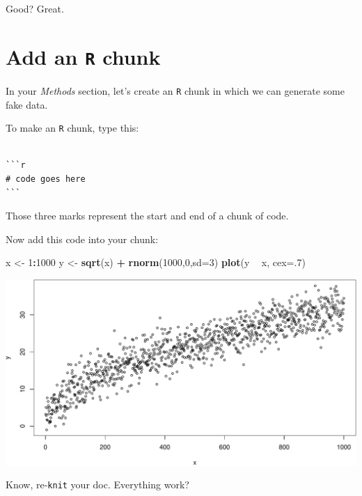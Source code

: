 \documentclass[]{book}
\newenvironment{Shaded}{\begin{snugshade}}{\end{snugshade}}
\newcommand{\DataTypeTok}[1]{\textcolor[rgb]{0.13,0.29,0.53}{#1}}
\newcommand{\DecValTok}[1]{\textcolor[rgb]{0.00,0.00,0.81}{#1}}
\newcommand{\KeywordTok}[1]{\textcolor[rgb]{0.13,0.29,0.53}{\textbf{#1}}}
\newcommand{\NormalTok}[1]{#1}
\newcommand{\OperatorTok}[1]{\textcolor[rgb]{0.81,0.36,0.00}{\textbf{#1}}}
\newcommand{\StringTok}[1]{\textcolor[rgb]{0.31,0.60,0.02}{#1}}
\begin{document}
Good? Great.

\hypertarget{add-an-r-chunk}{%
\section*{\texorpdfstring{Add an \texttt{R} chunk}{Add an R chunk}}\label{add-an-r-chunk}}

In your \emph{Methods} section, let's create an \texttt{R} chunk in which we can generate some fake data.

To make an \texttt{R} chunk, type this:

\begin{verbatim}

```r
# code goes here
```
\end{verbatim}

Those three marks represent the start and end of a chunk of code.

Now add this code into your chunk:

\begin{Shaded}
\begin{Highlighting}[]
\NormalTok{x <-}\StringTok{ }\DecValTok{1}\OperatorTok{:}\DecValTok{1000}
\NormalTok{y <-}\StringTok{ }\KeywordTok{sqrt}\NormalTok{(x) }\OperatorTok{+}\StringTok{ }\KeywordTok{rnorm}\NormalTok{(}\DecValTok{1000}\NormalTok{,}\DecValTok{0}\NormalTok{,}\DataTypeTok{sd=}\DecValTok{3}\NormalTok{)}
\KeywordTok{plot}\NormalTok{(y }\OperatorTok{~}\StringTok{ }\NormalTok{x, }\DataTypeTok{cex=}\NormalTok{.}\DecValTok{7}\NormalTok{)}
\end{Highlighting}
\end{Shaded}

\includegraphics{figures/unnamed-chunk-359-1.pdf}

Know, re-\texttt{knit} your doc. Everything work?
\end{document}
